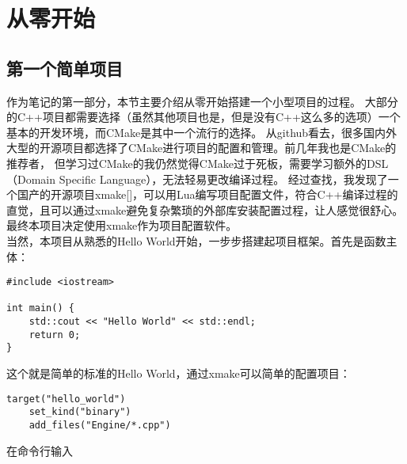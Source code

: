 \maketitle
\chapter{从零开始}

\section{第一个简单项目}
作为笔记的第一部分，本节主要介绍从零开始搭建一个小型项目的过程。
大部分的C++项目都需要选择（虽然其他项目也是，但是没有C++这么多的选项）一个基本的开发环境，而CMake是其中一个流行的选择。
从github看去，很多国内外大型的开源项目都选择了CMake进行项目的配置和管理。前几年我也是CMake的推荐者，
但学习过CMake的我仍然觉得CMake过于死板，需要学习额外的DSL（Domain Specific Language），无法轻易更改编译过程。
经过查找，我发现了一个国产的开源项目xmake[]，可以用Lua编写项目配置文件，符合C++编译过程的直觉，且可以通过xmake避免复杂繁琐的外部库安装配置过程，让人感觉很舒心。
最终本项目决定使用xmake作为项目配置软件。\\

当然，本项目从熟悉的Hello World开始，一步步搭建起项目框架。首先是函数主体：\\

\begin{lstlisting}[style=C++,title={Engine/main.cpp}]
#include <iostream>

int main() {
    std::cout << "Hello World" << std::endl;
    return 0;
}
\end{lstlisting}

% 
% 

这个就是简单的标准的Hello World，通过xmake可以简单的配置项目：\\

\begin{lstlisting}[style=Lua,title={xmake.lua}]
target("hello_world")
    set_kind("binary")
    add_files("Engine/*.cpp")
\end{lstlisting}

在命令行输入